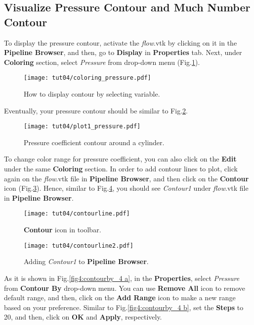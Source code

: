 \subsection{Visualize Pressure Contour and Much Number Contour}
To display the pressure contour, activate the \textit{flow}.vtk by clicking on it in the \textbf{Pipeline Browser}, and then, go to \textbf{Display} in \textbf{Properties} tab. Next, under \textbf{Coloring} section, select \textit{Pressure} from drop-down menu (Fig.\ref{fig4:pressure_coloring_4}).
\begin{figure}[htbp]
    \centering
    \texttt{[image: tut04/coloring\_pressure.pdf]}
    \caption{How to display contour by selecting variable.}
    \label{fig4:pressure_coloring_4}
\end{figure}
Eventually, your pressure contour should be similar to Fig.\ref{fig4:pressure_plot1_4}.
\begin{figure}[htbp]
    \centering
    \texttt{[image: tut04/plot1\_pressure.pdf]}
    \caption{Pressure coefficient contour around a cylinder.}
    \label{fig4:pressure_plot1_4}
\end{figure}
To change color range for pressure coefficient, you can also click on the \textbf{Edit} under the same \textbf{Coloring} section. In order to add contour lines to plot, click again on the \textit{flow}.vtk file in \textbf{Pipeline Browser}, and then click on the \textbf{Contour} icon (Fig.\ref{fig4:contourline1_4}). Hence, similar to Fig.\ref{fig4:contourline2_4}, you should see \textit{Contour1} under \textit{flow}.vtk file in \textbf{Pipeline Browser}. 
\begin{figure}[htbp]
    \centering
    \texttt{[image: tut04/contourline.pdf]}
    \caption{\textbf{Contour} icon in toolbar.}
    \label{fig4:contourline1_4}
\end{figure}
\begin{figure}[htbp]
    \centering
    \texttt{[image: tut04/contourline2.pdf]}
    \caption{Adding \textit{Contour1} to \textbf{Pipeline Browser}.}
    \label{fig4:contourline2_4}
\end{figure}
As it is shown in Fig.\ref{fig4:contourby_4 a}, in the \textbf{Properties}, select \textit{Pressure} from \textbf{Contour By} drop-down menu. You can use \textbf{Remove All} icon to remove default range, and then, click on the \textbf{Add Range} icon to make a new range based on your preference. Similar to Fig.\ref{fig4:contourby_4 b}, set the \textbf{Steps} to 20, and then, click on \textbf{OK} and \textbf{Apply}, respectively.

